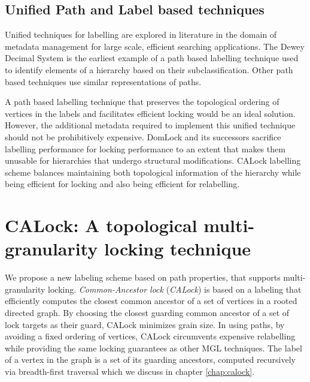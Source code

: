 \subsection{Unified Path and Label based techniques}
Unified techniques for labelling are explored in literature in the domain of metadata management for large scale, efficient searching applications. The Dewey Decimal System \cite{DBLP:journals/jd/Sweeney83} is the earliest example of a path based labelling technique used to identify elements of a hierarchy based on their subclassification. Other path based techniques use similar representations of paths. 

A path based labelling technique that preserves the topological ordering of vertices in the labels and facilitates efficient locking would be an ideal solution. However, the additional metadata required to implement this unified technique should not be prohibitively expensive. DomLock and its successors sacrifice labelling performance for locking performance to an extent that makes them unusable for hierarchies that undergo structural modifications. CALock labelling scheme balances maintaining both topological information of the hierarchy while being efficient for locking and also being efficient for relabelling. 

\section{CALock: A topological multi-granularity locking technique}

We propose a new labeling scheme based on path properties, that supports multi-granularity locking. {\em Common-Ancestor lock} ({\em CALock}) is based on a labeling that efficiently computes the closest common ancestor of a set of vertices in a rooted directed graph.
By choosing the closest guarding common ancestor of a set of lock targets as their guard, CALock minimizes grain size. In using paths, by avoiding a fixed ordering of vertices, CALock circumvents expensive relabelling while providing the same locking guarantees as other MGL techniques. The label of a vertex in the graph is a set of its guarding ancestors, computed recursively via breadth-first traversal which we discuss in chapter \ref{chap:calock}.
